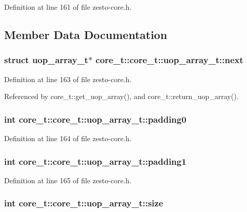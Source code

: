Definition at line 161 of file zesto-core.h.

\subsection{Member Data Documentation}
\subsubsection[{next}]{\setlength{\rightskip}{0pt plus 5cm}struct {\bf uop\_\-array\_\-t}$\ast$ core\_\-t::core\_\-t::uop\_\-array\_\-t::next\hspace{0.3cm}{\tt  [read]}}\label{structcore__t_1_1uop__array__t_f8a7574281e8445566d392db3271c9ac}




Definition at line 163 of file zesto-core.h.

Referenced by core\_\-t::get\_\-uop\_\-array(), and core\_\-t::return\_\-uop\_\-array().
\subsubsection[{padding0}]{\setlength{\rightskip}{0pt plus 5cm}int core\_\-t::core\_\-t::uop\_\-array\_\-t::padding0}\label{structcore__t_1_1uop__array__t_718f09bc5f372eaefc95b970d8f3a80d}




Definition at line 164 of file zesto-core.h.
\subsubsection[{padding1}]{\setlength{\rightskip}{0pt plus 5cm}int core\_\-t::core\_\-t::uop\_\-array\_\-t::padding1}\label{structcore__t_1_1uop__array__t_96bb020fd08c90f2b67959ba14d96354}




Definition at line 165 of file zesto-core.h.
\subsubsection[{size}]{\setlength{\rightskip}{0pt plus 5cm}int core\_\-t::core\_\-t::uop\_\-array\_\-t::size}\label{structcore__t_1_1uop__array__t_944d13f3f907e1ad1ec3fc71631ff4b6}




